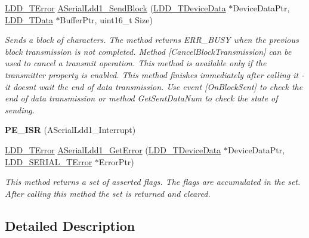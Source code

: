 \begin{DoxyCompactItemize}
\hyperlink{group___p_e___types__module_ga24c2b045fd04e79e85f261ce4df35588}{L\+D\+D\+\_\+\+T\+Error} \hyperlink{group___a_serial_ldd1__module_gad73f06e0eda26a76d0ec611a50e16b1d}{A\+Serial\+Ldd1\+\_\+\+Send\+Block} (\hyperlink{group___p_e___types__module_gac5cf1362f1f0e3a2ce71b1bf2276d091}{L\+D\+D\+\_\+\+T\+Device\+Data} $\ast$Device\+Data\+Ptr, \hyperlink{group___p_e___types__module_gade8ef9401405bd941b6da738b807f980}{L\+D\+D\+\_\+\+T\+Data} $\ast$Buffer\+Ptr, uint16\+\_\+t Size)
\begin{DoxyCompactList}\small\item\em Sends a block of characters. The method returns E\+R\+R\+\_\+\+B\+U\+SY when the previous block transmission is not completed. Method \mbox{[}Cancel\+Block\+Transmission\mbox{]} can be used to cancel a transmit operation. This method is available only if the transmitter property is enabled. This method finishes immediately after calling it -\/ it doesn\textquotesingle{}t wait the end of data transmission. Use event \mbox{[}On\+Block\+Sent\mbox{]} to check the end of data transmission or method Get\+Sent\+Data\+Num to check the state of sending. \end{DoxyCompactList}\item 
\mbox{\label{group___a_serial_ldd1__module_gaef4af12ca5f10beafaceb800c3c7d40c}} 
{\bfseries P\+E\+\_\+\+I\+SR} (A\+Serial\+Ldd1\+\_\+\+Interrupt)
\item 
\hyperlink{group___p_e___types__module_ga24c2b045fd04e79e85f261ce4df35588}{L\+D\+D\+\_\+\+T\+Error} \hyperlink{group___a_serial_ldd1__module_gaac860ccc68e9f89fb25d97ae0c56bd87}{A\+Serial\+Ldd1\+\_\+\+Get\+Error} (\hyperlink{group___p_e___types__module_gac5cf1362f1f0e3a2ce71b1bf2276d091}{L\+D\+D\+\_\+\+T\+Device\+Data} $\ast$Device\+Data\+Ptr, \hyperlink{group___p_e___types__module_ga3bd5d57e02458ce220540d0ad0462e06}{L\+D\+D\+\_\+\+S\+E\+R\+I\+A\+L\+\_\+\+T\+Error} $\ast$Error\+Ptr)
\begin{DoxyCompactList}\small\item\em This method returns a set of asserted flags. The flags are accumulated in the set. After calling this method the set is returned and cleared. \end{DoxyCompactList}\end{DoxyCompactItemize}


\subsection{Detailed Description}


